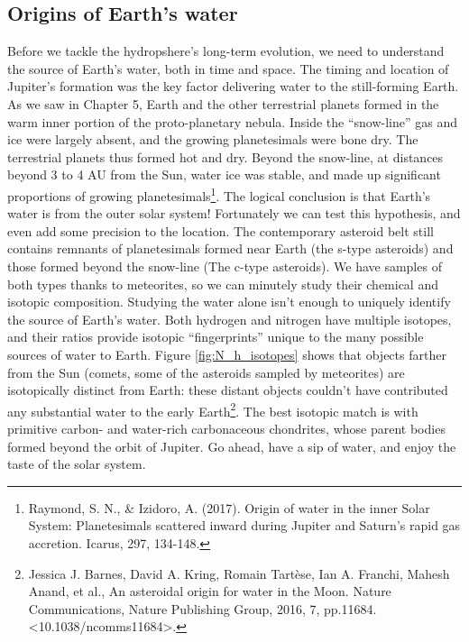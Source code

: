 \documentclass[amstex,12pt]{book}
\begin{document}
{\subsection{Origins of Earth's water}
Before we tackle the hydropshere's long-term evolution, we need to understand the source of Earth's water, both in time and space. The timing and location of Jupiter's formation was the key factor delivering water to the still-forming Earth. As we saw in Chapter 5, Earth and the other terrestrial planets formed in the warm inner portion of the proto-planetary nebula. Inside the ``snow-line'' gas and ice were largely absent, and the growing planetesimals were bone dry. The terrestrial planets thus formed hot and dry. Beyond the snow-line, at distances beyond 3 to 4 AU from the Sun, water ice was stable, and made up significant proportions of growing planetesimals\footnote{Raymond, S. N., \& Izidoro, A. (2017). Origin of water in the inner Solar System: Planetesimals scattered inward during Jupiter and Saturn’s rapid gas accretion. Icarus, 297, 134-148.}. The logical conclusion is that Earth's water is from the outer solar system! Fortunately we can test this hypothesis, and even add some precision to the location. The contemporary asteroid belt still contains remnants of planetesimals formed near Earth (the s-type asteroids) and those formed beyond the snow-line (The c-type asteroids). We have samples of both types thanks to meteorites, so we can minutely study their chemical and isotopic composition. Studying the water alone isn't enough to uniquely identify the source of Earth's water. Both hydrogen and nitrogen have multiple  isotopes, and their ratios provide isotopic ``fingerprints'' unique to the many possible sources of water to Earth. Figure \ref{fig:N_h_isotopes} shows that objects farther from the Sun (comets, some of the asteroids sampled by meteorites) are isotopically distinct from Earth: these distant objects couldn't have contributed any substantial water to the early Earth\footnote{Jessica J. Barnes, David A. Kring, Romain Tartèse, Ian A. Franchi, Mahesh Anand, et al., An asteroidal origin for water in the Moon. Nature Communications, Nature Publishing Group, 2016, 7, pp.11684. <10.1038/ncomms11684>.}. The best isotopic match is with primitive carbon- and water-rich carbonaceous chondrites, whose parent bodies formed beyond the orbit of Jupiter. Go ahead, have a sip of water, and enjoy the taste of the solar system.\\

}
\end{document}
